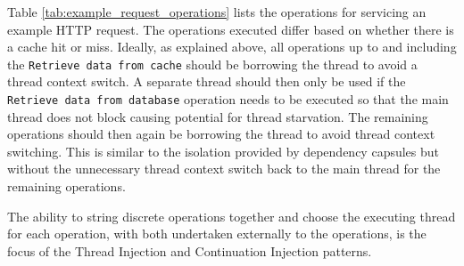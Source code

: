 \documentclass[prodmode]{style/acmlarge}
\begin{document}
Table \ref{tab:example_request_operations} lists the operations for servicing an
example HTTP request.  The operations executed differ based on whether there is
a cache hit or miss.  Ideally, as explained above, all operations up to and
including the \texttt{Retrieve data from cache} should be borrowing the thread
to avoid a thread context switch.  A separate thread should then only be used if
the \texttt{Retrieve data from database} operation needs to be executed so that
the main thread does not block causing potential for thread starvation.  The
remaining operations should then again be borrowing the thread to avoid thread
context switching.  This is similar to the isolation provided by dependency
capsules \cite{dependency-capsules} but without the unnecessary thread context
switch back to the main thread for the remaining operations.

\begin{table}[t]
\label{tab:example_request_operations}
\end{table}

The ability to string discrete operations together and choose the executing
thread for each operation, with both undertaken externally to the operations, is
the focus of the Thread Injection and Continuation Injection patterns.
\end{document}
